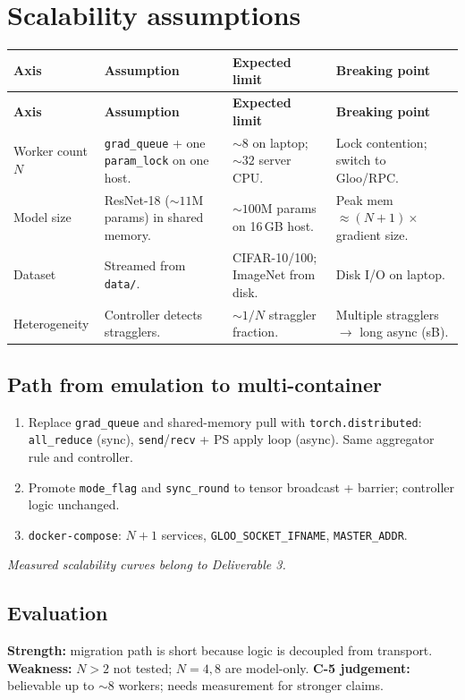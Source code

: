 \documentclass[11pt,a4paper]{article}
\begin{document}
\section{Scalability assumptions}

{\footnotesize
\begin{longtable}{@{}L L L L@{}}
  \toprule
  \textbf{Axis} & \textbf{Assumption} & \textbf{Expected limit} & \textbf{Breaking point} \\
  \midrule
  \endfirsthead
  \toprule
  \textbf{Axis} & \textbf{Assumption} & \textbf{Expected limit} & \textbf{Breaking point} \\
  \midrule
  \endhead
  \bottomrule
  \endfoot
  Worker count $N$ & \texttt{grad\_queue} + one \texttt{param\_lock} on one host. & ${\sim}8$ on laptop; ${\sim}32$ server CPU. & Lock contention; switch to Gloo/RPC. \\
  Model size & ResNet-18 (${\sim}11$M params) in shared memory. & ${\sim}100$M params on 16\,GB host. & Peak mem $\approx (N{+}1)\times$ gradient size. \\
  Dataset & Streamed from \texttt{data/}. & CIFAR-10/100; ImageNet from disk. & Disk I/O on laptop. \\
  Heterogeneity & Controller detects stragglers. & ${\sim}1/N$ straggler fraction. & Multiple stragglers $\to$ long async (sB). \\
\end{longtable}
}

\subsection{Path from emulation to multi-container}

\begin{enumerate}[leftmargin=*]
  \item Replace \texttt{grad\_queue} and shared-memory pull with \texttt{torch.distributed}: \texttt{all\_reduce} (sync), \texttt{send}/\texttt{recv} + PS apply loop (async). Same aggregator rule and controller.
  \item Promote \texttt{mode\_flag} and \texttt{sync\_round} to tensor broadcast + barrier; controller logic unchanged.
  \item \texttt{docker-compose}: $N{+}1$ services, \texttt{GLOO\_SOCKET\_IFNAME}, \texttt{MASTER\_ADDR}.
\end{enumerate}

\noindent\textit{Measured scalability curves belong to Deliverable 3.}

\subsection{Evaluation}
\textbf{Strength:} migration path is short because logic is decoupled from transport. \textbf{Weakness:} $N>2$ not tested; $N=4,8$ are model-only. \textbf{C-5 judgement:} believable up to ${\sim}8$ workers; needs measurement for stronger claims.
\end{document}

